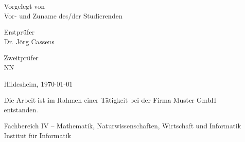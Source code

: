 \documentclass[11pt,        %
  english,ngerman,          %
  paper=a4,                 %
  captions=tablesignature,  %
  listof=numbered,          %
  bibliography=totoc,       %
  headings=small,           %
  headinclude=false,        %
  footinclude=false,        %
  parskip=half-,            %
  oneside,                  %
  BCOR=15mm,                 %
  DIV=12                    %
  ]{scrbook}                %
\begin{document}
\begin{titlepage}
\begin{center}
{      \vfill

      Vorgelegt von\\
      Vor- und Zuname des/der Studierenden

      \vfill

      Erstprüfer\\
      Dr. Jörg Cassens
  
      Zweitprüfer\\
      NN

      \vfill
      
      Hildesheim, \today
    }
      
      \vfill
      
    {
      \footnotesize 

      Die Arbeit ist im Rahmen einer Tätigkeit bei der Firma Muster GmbH entstanden.

      \vfill

      Fachbereich IV -- Mathematik, Naturwissenschaften, Wirtschaft und Informatik\\      
      Institut für Informatik
    }
  \end{center}
\end{titlepage}

\end{document}
